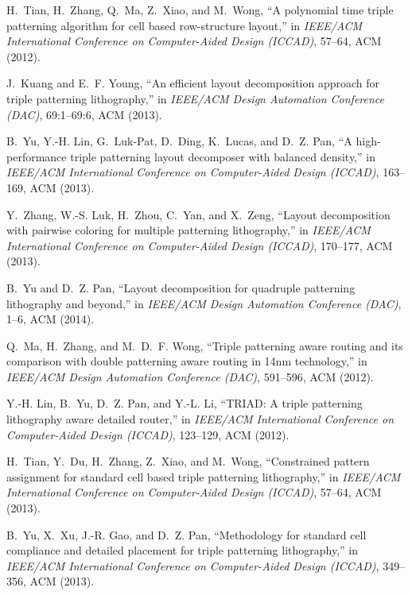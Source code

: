 \documentclass[12pt]{spieman}
\theoremstyle{plain}
\begin{document}
\begin{spacing}{1}
\begin{thebibliography}{10}
H.~Tian, H.~Zhang, Q.~Ma, Z.~Xiao, and M.~Wong, ``A polynomial time triple
  patterning algorithm for cell based row-structure layout,'' in {\em IEEE/ACM
  International Conference on Computer-Aided Design (ICCAD)},  57--64, ACM
  (2012).

J.~Kuang and E.~F. Young, ``An efficient layout decomposition approach for
  triple patterning lithography,'' in {\em IEEE/ACM Design Automation
  Conference (DAC)},  69:1--69:6, ACM  (2013).

B.~Yu, Y.-H. Lin, G.~Luk-Pat, D.~Ding, K.~Lucas, and D.~Z. Pan, ``A
  high-performance triple patterning layout decomposer with balanced density,''
  in {\em IEEE/ACM International Conference on Computer-Aided Design (ICCAD)},
  163--169, ACM  (2013).

Y.~Zhang, W.-S. Luk, H.~Zhou, C.~Yan, and X.~Zeng, ``Layout decomposition with
  pairwise coloring for multiple patterning lithography,'' in {\em IEEE/ACM
  International Conference on Computer-Aided Design (ICCAD)},  170--177, ACM
  (2013).

B.~Yu and D.~Z. Pan, ``Layout decomposition for quadruple patterning
  lithography and beyond,'' in {\em IEEE/ACM Design Automation Conference
  (DAC)},  1--6, ACM  (2014).

Q.~Ma, H.~Zhang, and M.~D.~F. Wong, ``Triple patterning aware routing and its
  comparison with double patterning aware routing in 14nm technology,'' in {\em
  IEEE/ACM Design Automation Conference (DAC)},  591--596, ACM  (2012).

Y.-H. Lin, B.~Yu, D.~Z. Pan, and Y.-L. Li, ``{TRIAD}: A triple patterning
  lithography aware detailed router,'' in {\em IEEE/ACM International
  Conference on Computer-Aided Design (ICCAD)},  123--129, ACM  (2012).

H.~Tian, Y.~Du, H.~Zhang, Z.~Xiao, and M.~Wong, ``Constrained pattern
  assignment for standard cell based triple patterning lithography,'' in {\em
  IEEE/ACM International Conference on Computer-Aided Design (ICCAD)},  57--64,
  ACM  (2013).

B.~Yu, X.~Xu, J.-R. Gao, and D.~Z. Pan, ``Methodology for standard cell
  compliance and detailed placement for triple patterning lithography,'' in
  {\em IEEE/ACM International Conference on Computer-Aided Design (ICCAD)},
  349--356, ACM  (2013).


\end{thebibliography}
\end{spacing}
\end{document}
